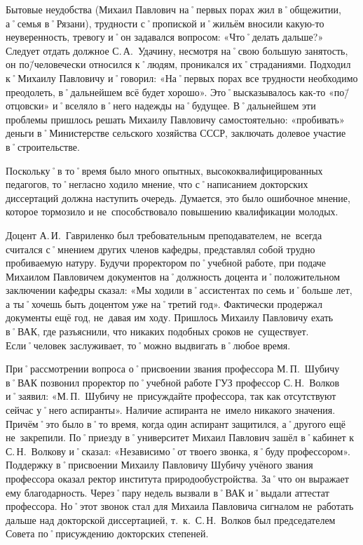 Бытовые неудобства (Михаил Павлович на˚первых порах жил в˚общежитии, а˚семья в˚Рязани), трудности с˚пропиской и˚жильём вносили какую-то неуверенность, тревогу и˚он задавался вопросом: «Что˚делать дальше?» Следует отдать должное С.\,А.~Удачину, несмотря на˚свою большую занятость, он по\=/человечески относился к˚людям, проникался их˚страданиями. Подходил к˚Михаилу Павловичу и˚говорил: «На˚первых порах все трудности необходимо преодолеть, в˚дальнейшем всё будет хорошо». Это˚высказывалось как-то «по\=/отцовски» и˚вселяло в˚него надежды на˚будущее. В˚дальнейшем эти проблемы пришлось решать Михаилу Павловичу самостоятельно: «пробивать» деньги в˚Министерстве сельского хозяйства СССР, заключать долевое участие в˚строительстве.

Поскольку˚в то˚время было много опытных, высококвалифицированных педагогов, то˚негласно ходило мнение, что с˚написанием докторских диссертаций должна наступить очередь. Думается, это было ошибочное мнение, которое тормозило и не~способствовало повышению квалификации молодых.

Доцент А.\,И.~Гавриленко был требовательным преподавателем, не~всегда считался с˚мнением других членов кафедры, представлял собой трудно пробиваемую натуру. Будучи проректором по˚учебной работе, при подаче Михаилом Павловичем документов на˚должность доцента и˚положительном заключении кафедры сказал: «Мы ходили в˚ассистентах по семь и˚больше лет, а ты˚хочешь быть доцентом уже на˚третий год». Фактически продержал документы ещё год, не~давая им ходу. Пришлось Михаилу Павловичу ехать в˚ВАК, где разъяснили, что никаких подобных сроков не~существует. Если˚человек заслуживает, то˚можно выдвигать в˚любое время.

При˚рассмотрении вопроса о˚присвоении звания профессора М.\,П.~Шубичу в˚ВАК позвонил проректор по˚учебной работе ГУЗ профессор С.\,Н.~Волков и˚заявил: «М.\,П.~Шубичу не~присуждайте профессора, так как отсутствуют сейчас у˚него аспиранты». Наличие аспиранта не~имело никакого значения. Причём˚это было в˚то время, когда один аспирант защитился, а˚другого ещё не~закрепили. По˚приезду в˚университет Михаил Павлович зашёл в˚кабинет к С.\,Н.~Волкову и˚сказал: «Независимо˚от твоего звонка, я˚буду профессором». Поддержку в˚присвоении Михаилу Павловичу Шубичу учёного звания профессора оказал ректор института природообустройства. За˚что он выражает ему благодарность. Через˚пару недель вызвали в˚ВАК и˚выдали аттестат профессора. Но˚этот звонок стал для Михаила Павловича сигналом не~работать дальше над докторской диссертацией, т.~к.~С.\,Н.~Волков был председателем Совета по˚присуждению докторских степеней.


